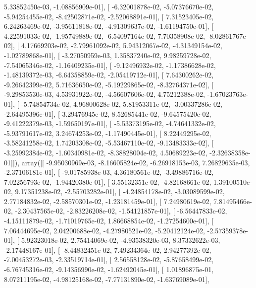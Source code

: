 \documentclass{article}
\begin{document}
          5.33852450e-03,  -1.08856909e-01],
       [ -6.32001878e-02,  -5.07376670e-02,  -5.94254455e-02,
         -8.42502871e-02,  -2.52068891e-01],
       [  7.31523405e-02,   6.24263469e-02,  -3.95611818e-02,
         -4.91309637e-02,  -1.61194750e-01],
       [  4.22591033e-02,  -1.95749889e-02,  -6.54097164e-02,
          7.70358908e-02,  -8.02861767e-02],
       [  4.17669203e-02,  -2.79961092e-02,   5.94312067e-02,
         -4.31349154e-02,  -1.02789868e-01],
       [ -3.27050959e-03,   1.35837240e-02,   9.98259728e-02,
         -7.54065346e-02,  -1.16409235e-01],
       [ -9.12496932e-02,  -1.17386628e-02,  -1.48139372e-03,
         -6.64358859e-02,  -2.05419712e-01],
       [  7.64300262e-02,  -9.26642399e-02,   5.71636650e-02,
         -5.19229865e-02,  -8.32764371e-02],
       [ -9.29853530e-03,   4.53931922e-02,  -4.56607606e-02,
          4.75212388e-02,  -1.67023763e-01],
       [ -5.74854734e-02,   4.96800628e-02,   5.81953311e-02,
         -3.00337286e-02,  -2.64495396e-01],
       [  3.29476945e-02,   8.52685441e-02,  -9.64575420e-02,
         -9.41222379e-03,  -1.59650197e-01],
       [ -5.53373195e-02,  -4.74641332e-02,  -5.93791617e-02,
          3.24674253e-02,  -1.17490445e-01],
       [  8.22449295e-02,  -3.58241258e-02,   1.74203308e-02,
         -5.53467110e-02,  -9.13483333e-02],
       [ -3.25992384e-02,  -1.60340981e-02,  -8.38828004e-02,
          4.50689223e-02,  -2.32638358e-01]]), array([[ -9.95030969e-03,  -8.16605824e-02,  -6.26918153e-03,
          7.26829635e-03,  -2.37106181e-01],
       [ -9.01785938e-03,   4.36180561e-02,  -3.49886716e-02,
          7.02256793e-02,  -1.94420380e-01],
       [  3.55132351e-02,  -4.82168661e-02,   1.39100510e-02,
          9.17351238e-02,  -2.55703282e-01],
       [ -4.24854178e-02,  -3.03089599e-02,   2.77184832e-02,
         -2.58570301e-02,  -1.23181459e-01],
       [  7.24980619e-02,   7.81495466e-02,  -2.30437565e-02,
         -2.83226208e-02,  -1.54121857e-01],
       [ -6.56447833e-02,  -4.15111879e-02,  -1.71019765e-02,
          1.86668854e-02,  -1.27254600e-01],
       [  7.06444695e-02,   2.04200688e-02,  -4.27980521e-02,
         -5.20412124e-02,  -2.57359378e-01],
       [  5.92323018e-02,   2.75414069e-02,  -4.93538320e-03,
          8.37332622e-03,  -2.17448167e-01],
       [ -8.44832451e-02,   7.49234364e-02,   2.94277392e-02,
         -7.00453272e-03,  -2.33519714e-01],
       [  2.56558128e-02,  -5.87658499e-02,  -6.76745316e-02,
         -9.14356990e-02,  -1.62492045e-01],
       [  1.01896875e-01,   8.07211195e-02,  -4.98125168e-02,
         -7.77131890e-02,  -1.63769089e-01],
\end{document}
